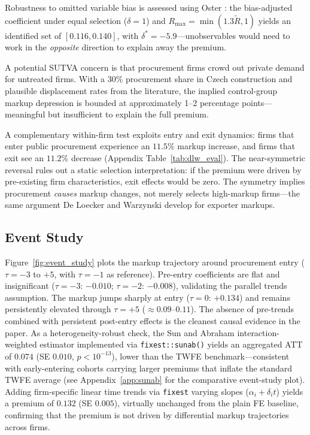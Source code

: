 \documentclass[11pt]{article}
\begin{document}
Robustness to omitted variable bias is assessed using Oster \cite{Oster2019}: the bias-adjusted coefficient under equal selection ($\delta = 1$) and $R_{\max} = \min(1.3\tilde{R}, 1)$ yields an identified set of $[0.116, 0.140]$, with $\delta^* = -5.9$---unobservables would need to work in the \emph{opposite} direction to explain away the premium.

A potential SUTVA concern is that procurement firms crowd out private demand for untreated firms. With a 30\% procurement share in Czech construction and plausible displacement rates from the literature, the implied control-group markup depression is bounded at approximately 1--2 percentage points---meaningful but insufficient to explain the full premium.

A complementary within-firm test exploits entry and exit dynamics: firms that enter public procurement experience an $11.5\%$ markup increase, and firms that exit see an $11.2\%$ decrease (Appendix Table~\ref{tab:dlw_eval}). The near-symmetric reversal rules out a static selection interpretation: if the premium were driven by pre-existing firm characteristics, exit effects would be zero. The symmetry implies procurement \emph{causes} markup changes, not merely selects high-markup firms---the same argument De Loecker and Warzynski \cite{DLW2012} develop for exporter markups.

\subsection{Event Study}\label{sec:event_study}

Figure~\ref{fig:event_study} plots the markup trajectory around procurement entry ($\tau = -3$ to $+5$, with $\tau = -1$ as reference). Pre-entry coefficients are flat and insignificant ($\tau = -3$: $-0.010$; $\tau = -2$: $-0.008$), validating the parallel trends assumption. The markup jumps sharply at entry ($\tau = 0$: $+0.134$) and remains persistently elevated through $\tau = +5$ ($\approx 0.09$--$0.11$). The absence of pre-trends combined with persistent post-entry effects is the cleanest causal evidence in the paper. As a heterogeneity-robust check, the Sun and Abraham \cite{SunAbraham2021} interaction-weighted estimator implemented via \texttt{fixest::sunab()} yields an aggregated ATT of $0.074$ (SE $0.010$, $p < 10^{-13}$), lower than the TWFE benchmark---consistent with early-entering cohorts carrying larger premiums that inflate the standard TWFE average (see Appendix~\ref{app:sunab} for the comparative event-study plot). Adding firm-specific linear time trends via \texttt{fixest} varying slopes ($\alpha_i + \delta_i t$) yields a premium of $0.132$ (SE $0.005$), virtually unchanged from the plain FE baseline, confirming that the premium is not driven by differential markup trajectories across firms.
\end{document}

